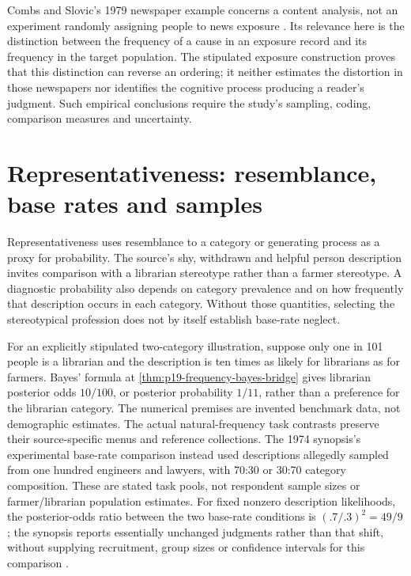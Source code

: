 Combs and Slovic's 1979 newspaper example concerns a content analysis,
not an experiment randomly assigning people to news exposure
\cite{CombsSlovic1979Newspaper}. Its relevance here is the distinction
between the frequency of a cause in an exposure record and its frequency
in the target population. The stipulated exposure construction proves
that this distinction can reverse an ordering; it neither estimates the
distortion in those newspapers nor identifies the cognitive process
producing a reader's judgment. Such empirical conclusions require the
study's sampling, coding, comparison measures and uncertainty.

\section{Representativeness: resemblance, base rates and samples}
\label{sec:p19-r24-representativeness}

Representativeness uses resemblance to a category or generating process
as a proxy for probability. The source's shy, withdrawn and helpful
person description invites comparison with a librarian stereotype rather
than a farmer stereotype. A diagnostic probability also depends on
category prevalence and on how frequently that description occurs in
each category. Without those quantities, selecting the stereotypical
profession does not by itself establish base-rate neglect.

For an explicitly stipulated two-category illustration, suppose only
one in 101 people is a librarian and the description is ten times as
likely for librarians as for farmers. Bayes' formula at
\cref{thm:p19-frequency-bayes-bridge} gives librarian posterior odds
\(10/100\), or posterior probability \(1/11\), rather than a
preference for the librarian category. The numerical premises are
invented benchmark data, not demographic estimates. The actual
natural-frequency task contrasts preserve their source-specific menus
and reference collections. The 1974 synopsis's experimental base-rate
comparison instead used descriptions allegedly sampled from one hundred
engineers and lawyers, with 70:30 or 30:70 category composition. These
are stated task pools, not respondent sample sizes or farmer/librarian
population estimates. For fixed nonzero description likelihoods, the
posterior-odds ratio between the two base-rate conditions is
\((.7/.3)^2=49/9\); the synopsis reports essentially unchanged
judgments rather than that shift, without supplying recruitment, group
sizes or confidence intervals for this comparison
\cite[pp.~1124--1125]{TverskyKahneman1974Heuristics}.


